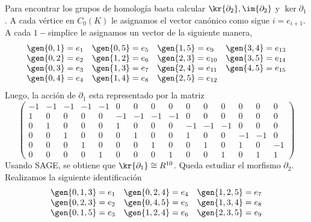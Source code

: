 \documentclass{article}
\begin{document}
\begin{enumerate}
    \vspace{2mm}
    Para encontrar los grupos de homología basta calcular $\kr{\partial_{2}},\im{\partial_{2}}$ y
    $\ker{\partial_{1}}$. A cada vértice en $C_{0}(K)$ le asignamos el vector canónico como sigue 
    $i=e_{i+1}$. A cada $1-$simplice le asignamos un vector de la siguiente manera,
    \begin{equation*}
        \begin{array}{llll}
            \gen{0,1}=e_{1} & \gen{0,5}=e_{5} & \gen{1,5}=e_{9} & \gen{3,4}=e_{13} \\
            \gen{0,2}=e_{2} & \gen{1,2}=e_{6} & \gen{2,3}=e_{10} & \gen{3,5}=e_{14} \\
            \gen{0,3}=e_{3} & \gen{1,3}=e_{7} & \gen{2,4}=e_{11} & \gen{4,5}=e_{15} \\
            \gen{0,4}=e_{4} & \gen{1,4}=e_{8} & \gen{2,5}=e_{12}
        \end{array}
    \end{equation*}
    Luego, la acción de $\partial_{1}$ esta representado por la matriz
    \begin{equation*}
        \begin{pmatrix}
            -1 & -1 & -1 & -1 & -1 & 0 & 0 & 0 & 0 & 0 & 0 & 0 & 0 & 0 & 0 \\
            1 & 0 & 0 & 0 & 0 & -1 & -1 & -1 & -1 & 0 & 0 & 0 & 0 & 0 & 0 \\
            0 & 1 & 0 & 0 & 0 & 1 & 0 & 0 & 0 & -1 & -1 & -1 & 0 & 0 & 0 \\
            0 & 0 & 1 & 0 & 0 & 0 & 1 & 0 & 0 & 1 & 0 & 0 & -1 & -1 & 0 \\
            0 & 0 & 0 & 1 & 0 & 0 & 0 & 1 & 0 & 0 & 1 & 0 & 1 & 0 & -1 \\
            0 & 0 & 0 & 0 & 1 & 0 & 0 & 0 & 1 & 0 & 0 & 1 & 0 & 1 & 1
        \end{pmatrix}
    \end{equation*}
    Usando SAGE, se obtiene que $\kr{\partial_{1}}\cong R^{10}$. Queda estudiar el morfismo 
    $\partial_{2}$. Realizamos la siguiente identificación
    \begin{equation*}
        \begin{array}{lll}
            \gen{0,1,3}=e_{1} & \gen{0,2,4}=e_{4} & \gen{1,2,5}=e_{7} \\
            \gen{0,2,3}=e_{2} & \gen{0,4,5}=e_{5} & \gen{1,3,4}=e_{8} \\
            \gen{0,1,5}=e_{3} & \gen{1,2,4}=e_{6} & \gen{2,3,5}=e_{9} \\

\end{array}
\end{equation*}
\end{enumerate}
\end{document}
